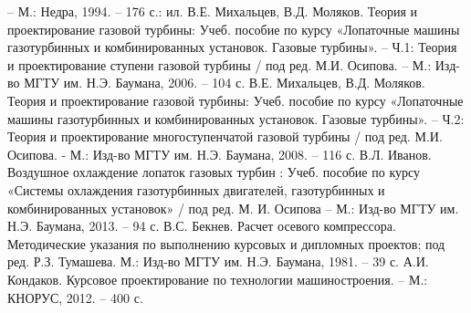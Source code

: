 \begin{thebibliography}{99}
    – М.: Недра, 1994. – 176 с.: ил.
     В.Е. Михальцев, В.Д. Моляков. Теория и проектирование газовой
    турбины: Учеб. пособие по курсу «Лопаточные машины газотурбинных и
    комбинированных установок. Газовые турбины». – Ч.1: Теория и
    проектирование ступени газовой турбины / под ред. М.И. Осипова. – М.: Изд-во
    МГТУ им. Н.Э. Баумана, 2006. – 104 с.
     В.Е. Михальцев, В.Д. Моляков. Теория и проектирование газовой
    турбины: Учеб. пособие по курсу «Лопаточные машины газотурбинных и
    комбинированных установок. Газовые турбины». – Ч.2: Теория и
    проектирование многоступенчатой газовой турбины / под ред. М.И. Осипова. -
    М.: Изд-во МГТУ им. Н.Э. Баумана, 2008. – 116 с.
     В.Л. Иванов. Воздушное охлаждение лопаток газовых турбин :
    Учеб. пособие по курсу «Системы охлаждения газотурбинных двигателей,
    газотурбинных и комбинированных установок» / под ред. М. И. Осипова – М.:
    Изд-во МГТУ им. Н.Э. Баумана, 2013. – 94 с.
     В.С. Бекнев. Расчет осевого компрессора. Методические указания
    по выполнению курсовых и дипломных проектов; под ред. Р.З. Тумашева. М.:
    Изд-во МГТУ им. Н.Э. Баумана, 1981. – 39 с.
     А.И. Кондаков. Курсовое проектирование по технологии
    машиностроения. – М.: КНОРУС, 2012. – 400 с.
\end{thebibliography}